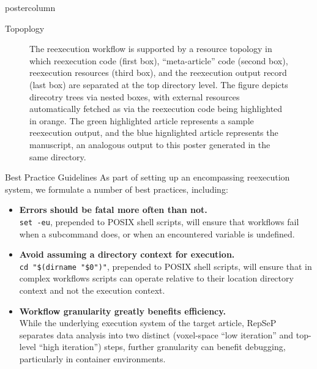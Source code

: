 \begin{frame}
\begin{columns}
\begin{column}{.42\textwidth}
\begin{beamercolorbox}[center]{postercolumn}
\begin{minipage}{.98\textwidth}
{\begin{myblock}{Topoplogy}
\begin{figure}
							\caption{
								The reexecution workflow is supported by a resource topology in which reexecution code (first box), “meta-article” code (second box), reexecution resources (third box), and the reexecution output record (last box) are separated at the top directory level.
								The figure depicts direcotry trees via nested boxes, with external resources automatically fetched as via the reexecution code being highlighted in orange.
								The green highlighted article represents a sample reexecution output, and the blue hignlighted article represents the manuscript, an analogous output to this poster generated in the same directory.
							}
							\label{fig:workflow}
						\end{figure}
					\end{myblock}\vfill
					\begin{myblock}{Best Practice Guidelines}
						\vspace{0.5em}
						As part of setting up an encompassing reexecution system, we formulate a number of best practices, including:
						\begin{itemize}
							\item \textbf{Errors should be fatal more often than not.}\\
								\colorbox{elg}{\texttt{set -eu}}, prepended to POSIX shell scripts, will ensure that workflows fail when a subcommand does, or when an encountered variable is undefined.
							\item \textbf{Avoid assuming a directory context for execution.}\\
								\colorbox{elg}{\texttt{cd "\$(dirname "\$0")"}}, prepended to POSIX shell scripts, will ensure that in complex workflows scripts can operate relative to their location directory context and not the execution context.
							\item \textbf{Workflow granularity greatly benefits efficiency.}\\
								While the underlying execution system of the target article, RepSeP \cite{repsep} separates data analysis into two distinct (voxel-space “low iteration” and top-level “high iteration”) steps, further granularity can benefit debugging, particularly in container environments.

\end{itemize}
\end{myblock}}
\end{minipage}
\end{beamercolorbox}
\end{column}
\end{columns}
\end{frame}
